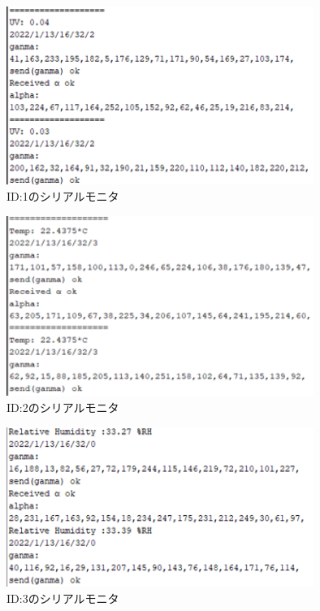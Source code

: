 \begin{figure}[H]
\begin{center}
	\includegraphics[width=10cm]{pc_uv.png}
	\caption{ID:1のシリアルモニタ}
	\label{fig:pc_uv}
\end{center}
\end{figure}
\begin{figure}[H]
\begin{center}
	\includegraphics[width=10cm]{pc_mcp.png}
	\caption{ID:2のシリアルモニタ}
	\label{fig:pc_mcp}
\end{center}
\end{figure}
\begin{figure}[H]
\begin{center}
	\includegraphics[width=10cm]{pc_hih.png}
	\caption{ID:3のシリアルモニタ}
	\label{fig:pc_hih}
\end{center}
\end{figure}

